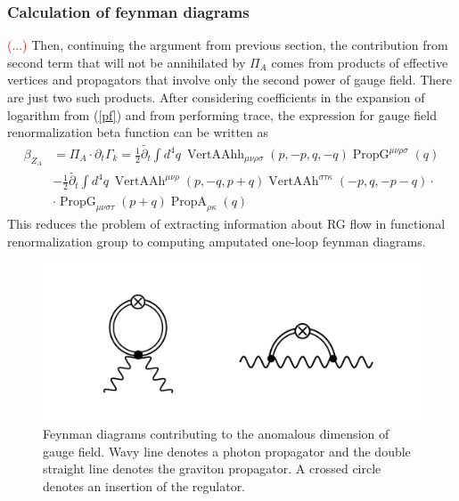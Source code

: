 \documentclass[11pt, a4paper]{article}
\begin{document}
\subsubsection{Calculation of feynman diagrams}
\textcolor{red}{(...)} Then, continuing the argument from previous section, the contribution from second term that will not be annihilated
by $\varPi_A$ comes from products of effective vertices and propagators that involve only the second power of gauge field.
There are just two such products. After considering coefficients in the expansion of logarithm from (\ref{pf}) and from performing trace, the expression for gauge field renormalization beta function can be written as
\begin{align}
    \beta_{Z_A} & = \varPi_A \cdot \partial_t \Gamma_k = \frac{1}{2} \widetilde{\partial_t} \int d^4 q \ \operatorname{VertAAhh}_{\mu\nu\rho\sigma}(p,-p,q,-q) \operatorname{PropG}^{\mu\nu\rho\sigma}(q)\\
    & - \frac{1}{2} \widetilde{\partial_t} \int d^4 q \ \operatorname{VertAAh}^{\mu\nu\rho}(p,-q,p+q) \operatorname{VertAAh}^{\sigma\tau\kappa}(-p,q,-p-q) \cdot \\
    & \cdot \operatorname{PropG}_{\mu\nu\sigma\tau}(p+q) \operatorname{PropA}_{\rho\kappa}(q)
\end{align}
This reduces the problem of extracting information about RG flow in functional renormalization group to computing amputated one-loop feynman diagrams.
\begin{figure}[H]
    \includegraphics[width=1\textwidth]{./figures/diags.png}
    \caption{Feynman diagrams contributing to the anomalous dimension of gauge field. Wavy line denotes a photon propagator
    and the double straight line denotes the graviton propagator. A crossed circle denotes an insertion of the regulator.}
    \label{diags}
\end{figure} 

\end{document}
